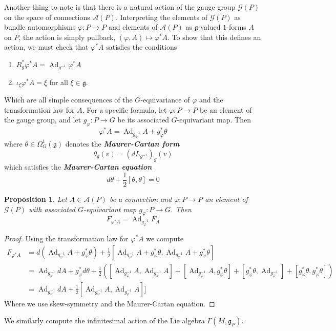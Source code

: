 \documentclass[psamsfonts, 12pt]{amsart}
\newtheorem{prop}[thm]{Proposition}
\theoremstyle{definition}
\theoremstyle{remark}
\newcommand{\ib}[1]{\textbf{\textit{#1}}}
\newcommand{\g}{\mathfrak{g}}
\newcommand{\inv}{^{-1}}
\DeclareMathOperator{\Ad}{Ad}
\begin{document}
Another thing to note is that there is a natural action of the gauge group
$\mathscr{G}(P)$ on the space of connections $\mathscr{A}(P)$. Interpreting the
elements of $\mathscr{G}(P)$ as bundle automorphisms $\varphi : P \to P$ and
elements of $\mathscr{A}(P)$ as $\g$-valued $1$-forms $A$ on $P$, the action
is simply pullback, $(\varphi,A) \mapsto \varphi^*A$. To show that
this defines an action, we must check that $\varphi^*A$ satisfies the conditions
%
\begin{enumerate}
  \item $R_g^*\varphi^*A = \Ad_{g\inv} \varphi^*A$
  \item $\iota_\xi \varphi^*A = \xi$ for all $\xi \in \g$.
\end{enumerate}
%
Which are all simple consequences of the $G$-equivariance of $\varphi$ and
the transformation law for $A$. For a specific formula, let
$\varphi : P \to P$ be an element of the gauge group, and let
$g_\varphi : P \to G$ be its associated $G$-equivariant map. Then
\[
\varphi^*A = \Ad_{g_\varphi\inv} A + g_\varphi^*\theta
\]
where $\theta \in \Omega^1_G(\g)$ denotes the \ib{Maurer-Cartan form}
\[
\theta_g(v) = (dL_{g\inv})_g(v)
\]
which satisfies the \ib{Maurer-Cartan equation}
\[
d\theta + \frac{1}{2}[\theta,\theta] = 0
\]
%
\begin{prop}
Let $A \in \mathscr{A}(P)$ be a connection and $\varphi : P \to P$ an element
of $\mathscr{G}(P)$ with associated $G$-equivariant map $g_\varphi : P \to G$.
Then
\[
F_{\varphi^*A} = \Ad_{g_\varphi\inv} F_A
\]
\end{prop}
%
\begin{proof}
Using the transformation law for $\varphi^*A$ we compute
\begin{align*}
F_{\varphi^*A} &= d(\Ad_{g_\varphi\inv} A + g_\varphi^*\theta)
+ \frac{1}{2}[\Ad_{g_\varphi\inv} A + g_\varphi^*\theta,
\Ad_{g_\varphi\inv} A + g_\varphi^*\theta] \\
&= \Ad_{g_\varphi\inv}dA + g_\varphi^*d\theta + \frac{1}{2}
\left([\Ad_{g_\varphi\inv}A, \Ad_{g_\varphi\inv} A] + [\Ad_{g_\varphi\inv} A,
g_\varphi^*\theta] + [g^*_\varphi\theta, \Ad_{g_\varphi\inv}]
+ [g_\varphi^*\theta,g_\varphi^*\theta] \right) \\
&= \Ad_{g_\varphi\inv} dA + \frac{1}{2}[\Ad_{g_\varphi\inv}A, \Ad_{g_\varphi\inv} A]]
\end{align*}
Where we use skew-symmetry and the Maurer-Cartan equation.
\end{proof}
%
We similarly compute the infinitesimal action of the Lie algebra $\Gamma(M,\g_P)$.
\end{document}
